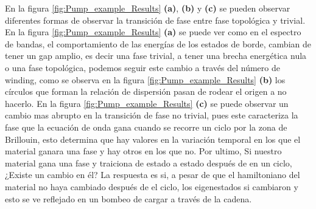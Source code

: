 En la figura \ref{fig:Pump_example_Results} \textbf{(a)}, \textbf{(b)} y \textbf{(c)} se pueden observar diferentes formas de observar la transición de fase entre fase topológica y trivial. En la figura \ref{fig:Pump_example_Results} \textbf{(a)} se puede ver como en el espectro de bandas, el comportamiento de las energías de los estados de borde, cambian de tener un gap amplio, es decir una fase trivial, a tener una brecha energética nula o una fase topológica, podemos seguir este cambio a través del número de winding, como se observa en la figura \ref{fig:Pump_example_Results} \textbf{(b)} los círculos que forman la relación de dispersión pasan de rodear el origen a no hacerlo. En la figura \ref{fig:Pump_example_Results} \textbf{(c)} se puede observar un cambio mas abrupto en la transición de fase no trivial, pues este caracteriza la fase que la ecuación de onda gana cuando se recorre un ciclo por la zona de Brillouin, esto determina que hay valores en la variación temporal en los que el material ganara una fase y hay otros en los que no. Por ultimo, Si nuestro material gana una fase y traiciona de estado a estado después de en un ciclo, ¿Existe un cambio en él? La respuesta es si, a pesar de que el hamiltoniano del material no haya cambiado después de el ciclo, los eigenestados si cambiaron y esto se ve reflejado en un bombeo de cargar a través de la cadena.

